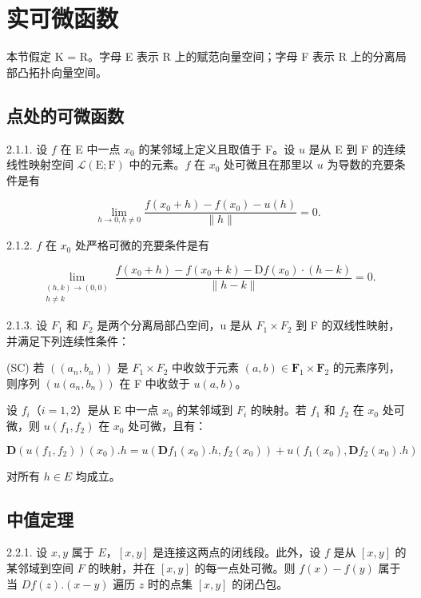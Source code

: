 \section{实可微函数}

本节假定 K = R。字母 E 表示 R 上的赋范向量空间；字母 F 表示 R 上的分离局部凸拓扑向量空间。

\subsection{点处的可微函数}

2.1.1. 设 \(f\) 在 E 中一点 \(x_{0}\) 的某邻域上定义且取值于 F。设 \(u\) 是从 E 到 F 的连续线性映射空间 \(\mathcal{L}(\mathrm{E};\mathrm{F})\) 中的元素。\(f\) 在 \(x_{0}\) 处可微且在那里以 \(u\) 为导数的充要条件是有

\[
\lim _ {h \rightarrow 0, h \neq 0} \frac {f (x _ {0} + h) - f (x _ {0}) - u (h)}{\| h \|} = 0.
\]

2.1.2. \(f\) 在 \(x_{0}\) 处严格可微的充要条件是有

\[
\lim_{\substack{(h,k)\to (0,0)\\ h\neq k}}\frac{f(x_{0} + h) - f(x_{0} + k) - \mathrm{D}f(x_{0})\cdot(h - k)}{\|h - k\|} = 0.
\]

2.1.3. 设 \(F_{1}\) 和 \(F_{2}\) 是两个分离局部凸空间，u 是从 \(F_{1} \times F_{2}\) 到 F 的双线性映射，并满足下列连续性条件：

(SC) 若 \(((a_{n}, b_{n}))\) 是 \(F_{1} \times F_{2}\) 中收敛于元素 \((a, b) \in \mathbf{F}_{1} \times \mathbf{F}_{2}\) 的元素序列，则序列 \((u(a_{n}, b_{n}))\) 在 F 中收敛于 \(u(a, b)\)。

设 \(f_{i}\)（\(i = 1, 2\)）是从 E 中一点 \(x_{0}\) 的某邻域到 \(F_{i}\) 的映射。若 \(f_{1}\) 和 \(f_{2}\) 在 \(x_{0}\) 处可微，则 \(u(f_{1}, f_{2})\) 在 \(x_{0}\) 处可微，且有：

\[
\mathbf {D} (u (f _ {1}, f _ {2})) (x _ {0}). h = u (\mathbf {D} f _ {1} (x _ {0}). h, f _ {2} (x _ {0})) + u (f _ {1} (x _ {0}), \mathbf {D} f _ {2} (x _ {0}). h)
\]

对所有 \(h \in E\) 均成立。

\subsection{中值定理}

2.2.1. 设 \(x,y\) 属于 \(E\)，\([x,y]\) 是连接这两点的闭线段。此外，设 \(f\) 是从 \([x,y]\) 的某邻域到空间 \(F\) 的映射，并在 \([x,y]\) 的每一点处可微。则 \(f(x)-f(y)\) 属于当 \(Df(z).(x-y)\) 遍历 \(z\) 时的点集 \([x,y]\) 的闭凸包。

